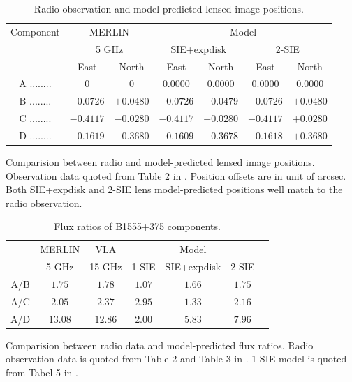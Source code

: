 \documentclass[useAMS,usenatbib]{mn2e}
\begin{document}
\begin{table}
 \begin{minipage}{140mm}
  \caption{Radio observation and model-predicted lensed image positions.}
  \begin{tabular}{@{}ccccccc}

\hline

Component	&\multicolumn{2}{c}{MERLIN} 	 & \multicolumn{4}{c}{Model} \\
					&\multicolumn{2}{c}{5 GHz}		&	\multicolumn{2}{c}{SIE+expdisk} &\multicolumn{2}{c}{ 2-SIE}		\\
					 &East &North &East 		&North &East 		&North\\ 
\hline
A ........ &$0$    		&$0$		&$0.0000$ &$0.0000$   &   $0.0000$   &  $ 0.0000$\\  
B ........ &$-0.0726$ 	&$+0.0480$	&$-0.0726$ &$+0.0479$ & $-0.0726 $  &  $+0.0480$  \\  
C ........ &$-0.4117$  &$-0.0280$	&$-0.4117$ &$-0.0280$  & $-0.4117 $  &   $+0.0280$ \\  
D ........ &$-0.1619$  &$-0.3680$	&$-0.1609$ &$-0.3678$  & $-0.1618$    &  $+0.3680$ \\  
\hline
\end{tabular}

\end{minipage}
\medskip

Comparision between radio and model-predicted lensed image positions. Observation data quoted from Table 2 in \citet{Marlow}. Position offsets are in unit of arcsec. Both SIE+expdisk and 2-SIE lens model-predicted positions well match to the radio observation.

\end{table}

\begin{table}
  \caption{Flux ratios of B1555+375 components.}
  \begin{tabular}{@{}ccccccc}

\hline
	& MERLIN & VLA & \multicolumn{3}{c}{Model}\\
		&5 GHz & 15 GHz  & 1-SIE & SIE+expdisk & 2-SIE\\
\hline
A/B			&$1.75$ & $1.78$ &$1.07$& $1.66$ & $1.75$ \\ 
A/C 		&$2.05$ 	&$2.37$ &$2.95$ & $1.33$ & $2.16$\\
A/D			&$13.08$ &$ 12.86$ &$2.00$& $5.83$ & $7.96$\\

\hline
\end{tabular}

\medskip
Comparision between radio data and model-predicted flux ratios. Radio observation data is quoted from Table 2 and Table 3 in \citet{Marlow}. 1-SIE model is quoted from Tabel 5 in \citet{Marlow}.

\end{table}
\end{document}
